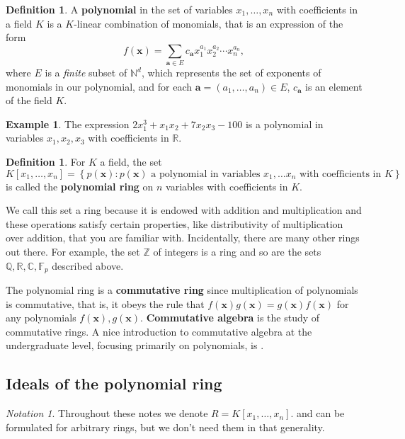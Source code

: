 \documentclass[11pt]{amsart}
\newcommand{\C}{{\mathbb C}}
\newcommand{\F}{{\mathbb F}}
\newcommand{\N}{{\mathbb N}}
\newcommand{\R}{{\mathbb R}}
\newcommand{\Q}{{\mathbb Q}}
\newcommand{\Z}{{\mathbb Z}}
\newcommand{\ba}{{\mathbf a}}
\newcommand{\bx}{{\mathbf x}}
\theoremstyle{plain} %
\theoremstyle{definition}
\newtheorem{defn}[thm]{Definition}
\newtheorem{ex}[thm]{Example}
\theoremstyle{remark}
\newtheorem{notation}[thm]{Notation}
\numberwithin{equation}{section}  %
\begin{document}
\begin{tcolorbox}
\begin{defn} A {\bf polynomial} in the set of  variables $x_1, \ldots, x_n$ with coefficients in a field $K$ is a $K$-linear combination of monomials, that is an expression of the form
\[
f(\bx)= \sum _{\ba\in E} c_\ba x_1^{a_1}x_2^{a_2} \cdots x_n^{a_n},
\]
where $E$ is a {\em finite} subset of  $\N^d$, which represents the set of exponents of monomials in our polynomial, and for each $\ba=(a_1,\ldots, a_n)\in E$, $c_\ba$ is an element of the field $K$. %
\end{defn}
\end{tcolorbox}

\begin{ex}
The expression $2x_1^3+x_1x_2+7x_2x_3-100$ is a polynomial in variables $x_1, x_2, x_3$ with coefficients in $\R$. 
\end{ex}



\begin{tcolorbox}
\begin{defn} For $K$ a field, the set  
\[
K[x_1,\ldots , x_n]=\left  \{p(\bx) : p(\bx) \text{ a polynomial in variables }x_1,\ldots x_n \text{ with coefficients in }K \right \}
\]
is called the {\bf polynomial ring} on $n$ variables with coefficients in $K$. 
\end{defn}
\end{tcolorbox}
We call this set a ring because it is endowed with addition and multiplication and these operations satisfy certain properties, like distributivity of multiplication over addition, that you are  familiar with. Incidentally, there are many other rings out there. For example, the set $\Z$ of integers is a ring and so are the sets $\Q, \R, \C, \F_p$ described above.

The polynomial ring is a {\bf commutative ring} since multiplication of polynomials is commutative, that is, it obeys the rule that $f(\bx)g(\bx)=g(\bx)f(\bx)$ for any polynomials $f(\bx),g(\bx)$. {\bf Commutative algebra} is the study of commutative rings. A nice introduction to commutative algebra at the undergraduate level, focusing primarily on polynomials, is \cite{CLO}.


\subsection{Ideals of the polynomial ring}
\begin{notation}
Throughout these notes we denote $R=K[x_1,\ldots, x_n]$.  and   can be formulated for arbitrary rings, but we don't need them in that generality.
\end{notation}
\end{document}
